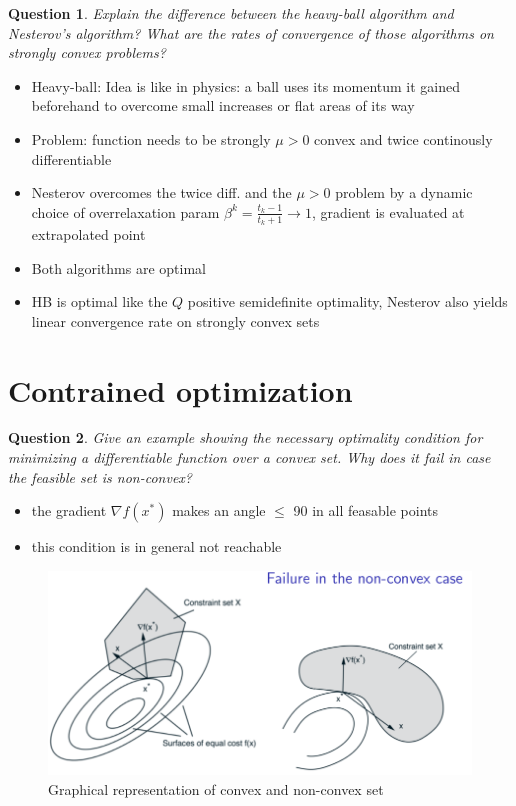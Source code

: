 \documentclass{article}
\newtheorem{question}{Question}
\begin{document}
\begin{question}
  Explain the difference between the heavy-ball algorithm and Nesterov’s algorithm? What are the
  rates of convergence of those algorithms on strongly convex problems?
\end{question}
\begin{itemize}
\item Heavy-ball: Idea is like in physics: a ball uses its momentum it gained beforehand to overcome
  small increases or flat areas of its way
\item Problem: function needs to be strongly $\mu > 0$ convex and twice continously differentiable
\item Nesterov overcomes the twice diff. and the $\mu > 0$ problem by a dynamic choice of
  overrelaxation param $\beta^k = \frac{t_k - 1}{t_k + 1} \rightarrow 1$, gradient is evaluated at
  extrapolated point
\item Both algorithms are optimal
\item HB is optimal like the $Q$ positive semidefinite optimality, Nesterov also yields linear
  convergence rate on strongly convex sets
\end{itemize}

\section{Contrained optimization}

\begin{question}
  Give an example showing the necessary optimality condition for minimizing a differentiable
  function over a convex set. Why does it fail in case the feasible set is non-convex?
\end{question}
\begin{itemize}
\item the gradient $\nabla f(x^*)$ makes an angle $\leq$ 90 in all feasable points
\item this condition is in general not reachable

\end{itemize}
\begin{figure}[H]
  \includegraphics[width=\textwidth]{non_convex.png}
  \caption{Graphical representation of convex and non-convex set \label{fig:convex}}
\end{figure}
\end{document}
